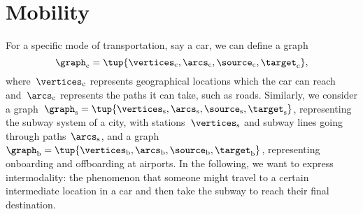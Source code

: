 
\section{Mobility}

For a specific mode of transportation, say a car, we can define a graph
\begin{equation*}
	\graph_\mathrm{c}=\tup{
		\vertices_{\mathrm{c}},
		\arcs_{\mathrm{c}},
		\source_{\mathrm{c}},
		\target_{\mathrm{c}}
	},
\end{equation*}
where~$\vertices_\mathrm{c}$ represents geographical locations which the car can reach and~$\arcs_\mathrm{c}$ represents the paths it can take, such as roads.
Similarly, we consider a graph~$\graph_\mathrm{s}=\tup{\vertices_\mathrm{s},\arcs_\mathrm{s},\source_\mathrm{s},\target_\mathrm{s}}$, representing the subway system of a city, with stations~$\vertices_\mathrm{s}$ and subway lines going through paths~$\arcs_\mathrm{s}$, and a graph $\graph_\mathrm{b}=\tup{\vertices_\mathrm{b},\arcs_\mathrm{b},\source_\mathrm{b},\target_\mathrm{b}}$, representing onboarding and offboarding at airports.
In the following, we want to express intermodality: the phenomenon that someone might travel to a certain intermediate location in a car and then take the subway to reach their final destination.

